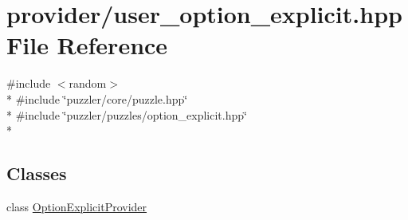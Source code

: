 \hypertarget{a00138}{}\section{provider/user\+\_\+option\+\_\+explicit.hpp File Reference}
\label{a00138}
{\ttfamily \#include $<$random$>$}\\*
{\ttfamily \#include \char`\"{}puzzler/core/puzzle.\+hpp\char`\"{}}\\*
{\ttfamily \#include \char`\"{}puzzler/puzzles/option\+\_\+explicit.\+hpp\char`\"{}}\\*
\subsection*{Classes}
\begin{DoxyCompactItemize}
\item 
class \hyperlink{a00021}{Option\+Explicit\+Provider}
\end{DoxyCompactItemize}

